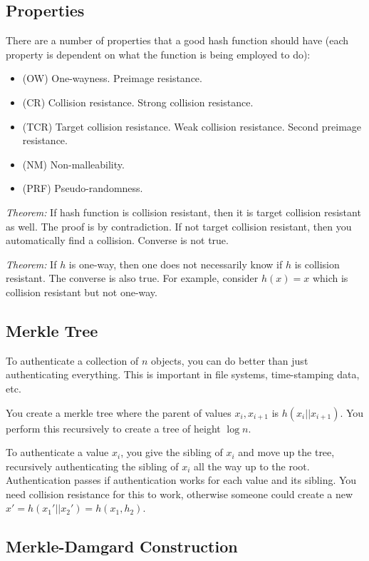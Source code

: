 \documentclass[psamsfonts]{amsart}
\begin{document}
\subsection{Properties}

There are a number of properties that a good hash function should have (each property is dependent on what the function is being employed to do):
\begin{itemize}
  \item (OW) One-wayness. Preimage resistance.
  \item (CR) Collision resistance. Strong collision resistance.
  \item (TCR) Target collision resistance. Weak collision resistance. Second preimage resistance.
  \item (NM) Non-malleability.
  \item (PRF) Pseudo-randomness.
\end{itemize}

\emph{Theorem:} If hash function is collision resistant, then it is target collision resistant as well. The proof is by contradiction. If not target collision resistant, then you automatically find a collision. Converse is not true.

\emph{Theorem:} If $h$ is one-way, then one does not necessarily know if $h$ is collision resistant. The converse is also true. For example, consider $h(x) = x$ which is collision resistant but not one-way.

\subsection{Merkle Tree}

To authenticate a collection of $n$ objects, you can do better than just authenticating everything. This is important in file systems, time-stamping data, etc.

You create a merkle tree where the parent of values $x_i, x_{i+1}$ is $h(x_i || x_{i+1})$. You perform this recursively to create a tree of height $\log n$.

To authenticate a value $x_i$, you give the sibling of $x_i$ and move up the tree, recursively authenticating the sibling of $x_i$ all the way up to the root. Authentication passes if authentication works for each value and its sibling. You need collision resistance for this to work, otherwise someone could create a new $x' = h(x_1' || x_2') = h(x_1, h_2)$.

\subsection{Merkle-Damgard Construction}
\end{document}
